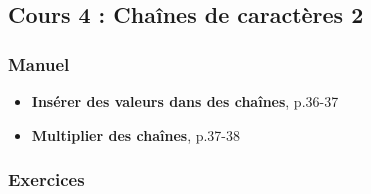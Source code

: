 \documentclass[11pt]{article}
\begin{document}
\subsection*{Cours 4 : Chaînes de caractères 2}
\label{chapitre2_cours4}
\subsubsection*{Manuel}
\label{sec:org7925f0e}
\begin{itemize}
\item \textbf{\og Insérer des valeurs dans des chaînes\fg{}}, p.36-37
\item \textbf{\og Multiplier des chaînes\fg{}}, p.37-38
\end{itemize}
\subsubsection*{Exercices}
\label{sec:org1586dd1}
\end{document}
